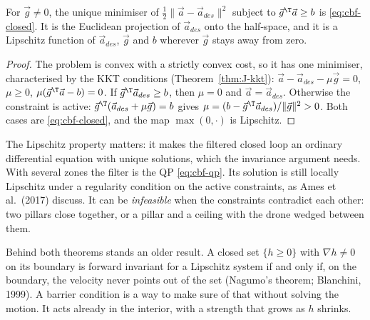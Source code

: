 \begin{theorem}
\label{thm:cbf-proj}
For $\vec g \ne 0$, the unique minimiser of $\tfrac12\|\vec a - \vec a_{des}\|^2$ subject to $\vec g^\T\vec a \ge b$ is \cref{eq:cbf-closed}. It is the Euclidean projection of $\vec a_{des}$ onto the half-space, and it is a Lipschitz function of $\vec a_{des}$, $\vec g$ and $b$ wherever $\vec g$ stays away from zero.
\end{theorem}
\begin{proof}
The problem is convex with a strictly convex cost, so it has one minimiser, characterised by the KKT conditions (Theorem~\ref{thm:J-kkt}): $\vec a - \vec a_{des} - \mu\vec g = 0$, $\mu \ge 0$, $\mu(\vec g^\T\vec a - b) = 0$. If $\vec g^\T\vec a_{des} \ge b$, then $\mu = 0$ and $\vec a = \vec a_{des}$. Otherwise the constraint is active: $\vec g^\T(\vec a_{des} + \mu\vec g) = b$ gives $\mu = (b - \vec g^\T\vec a_{des})/\|\vec g\|^2 > 0$. Both cases are \cref{eq:cbf-closed}, and the map $\max(0, \cdot)$ is Lipschitz.
\end{proof}

The Lipschitz property matters: it makes the filtered closed loop an ordinary differential equation with unique solutions, which the invariance argument needs. With several zones the filter is the QP \cref{eq:cbf-qp}. Its solution is still locally Lipschitz under a regularity condition on the active constraints, as Ames et al.\ (2017) discuss. It can be \emph{infeasible} when the constraints contradict each other: two pillars close together, or a pillar and a ceiling with the drone wedged between them.

Behind both theorems stands an older result. A closed set $\{h \ge 0\}$ with $\nabla h \ne 0$ on its boundary is forward invariant for a Lipschitz system if and only if, on the boundary, the velocity never points out of the set (Nagumo's theorem; Blanchini, 1999). A barrier condition is a way to make sure of that without solving the motion. It acts already in the interior, with a strength that grows as $h$ shrinks.

